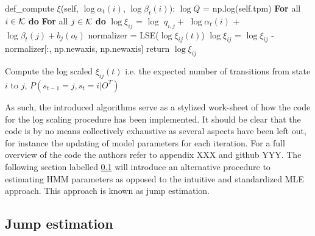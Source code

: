 \newpage
\begin{algorithm}[H]
def\_compute $\xi$(self, $\log\alpha_t(i)$, $\log\beta_t(i)$): \;
\Indp 
$\log Q$ = np.log(self.tpm) \;
\BlankLine
\Indm
\textbf{For} all $i \in \operatorname{\mathcal{K}} $ \textbf{do} \;
\Indp
\textbf{For} all $j \in \operatorname{\mathcal{K}}$ \textbf{do} \;
\Indp
$\log\xi_{ij}$ = $\log$ $q_{i,j} +$ $\log\alpha_{t}(i)$ + $\log\beta_t(j) + b_j(o_t)$ \;
\Indm
\Indm
normalizer = LSE($\log\xi_{ij}(t)$) \;
\BlankLine
$\log\xi_{ij}$ = $\log\xi_{ij}$ - normalizer[:, np.newaxis, np.newaxis] \;
return $\log\xi_{ij}$
\caption{Compute the log scaled $\xi_{ij}(t)$ i.e. the expected number of transitions from state $i$ to $j$, $P(s_{t-1} = j, s_t = i |O^T)$}
\label{algo: log_scaled_xi}
\end{algorithm}

As such, the introduced algorithms serve as a stylized work-sheet of how the code for the log scaling procedure has been implemented. It should be clear that the code is by no means collectively exhaustive as several aspects have been left out, for instance the updating of model parameters for each iteration. For a full overview of the code the authors refer to appendix XXX and github YYY. The following section labelled \ref{subsection: Jump theory} will introduce an alternative procedure to estimating HMM parameters as opposed to the intuitive and standardized MLE approach. This approach is known as jump estimation.

\subsection{Jump estimation}
\label{subsection: Jump theory}

